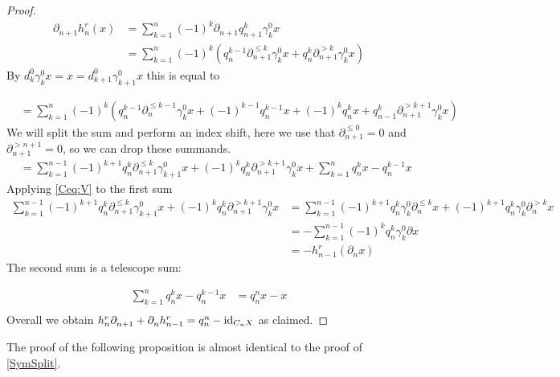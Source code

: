 \documentclass[12pt]{amsart}
\theoremstyle{plain}
\numberwithin{lemma}{\DefaultNumberTheoremWithin}
\numberwithin{claim}{\DefaultNumberTheoremWithin}
\numberwithin{theorem}{\DefaultNumberTheoremWithin}
\numberwithin{corollary}{\DefaultNumberTheoremWithin}
\numberwithin{proposition}{\DefaultNumberTheoremWithin}
\numberwithin{conjecture}{\DefaultNumberTheoremWithin}
\theoremstyle{definition}
\theoremstyle{definition}
\numberwithin{question}{\DefaultNumberTheoremWithin}
\theoremstyle{definition}
\numberwithin{problem}{\DefaultNumberTheoremWithin}
\theoremstyle{remark}
\numberwithin{remark}{\DefaultNumberTheoremWithin}
\theoremstyle{remark}
\numberwithin{example}{\DefaultNumberTheoremWithin}
\def\id{\textnormal{id}}
\def\Connection{\gamma}
\newcommand{\del}{\partial}
\newcommand{\argdelkub}[2]{\del^{#1}_{#2}}
\newcommand{\prev}[2]{q_{#2}^{#1}}
\newcommand{\hrev}[1]{h^r_{#1}}
\begin{document}
\begin{proof}
    \begin{align*}
        \argdelkub{}{n+1} \hrev{n}(x) &= \sum_{k=1}^n(-1)^k \argdelkub{}{n+1} \prev{k}{n+1}\Connection_k^0 x \\
        &=\sum_{k=1}^n(-1)^k(\prev{k-1}{n}\argdelkub{\leq k}{n+1}\Connection_k^0x + \prev{k}{n}\argdelkub{>k}{n+1}\Connection_k^0x)
        \end{align*}
    By $d_k^0\Connection_k^0x=x=d_{k+1}^0\Connection_{k+1}^0x$ this is equal to 
        
    \begin{align*}
        &=\sum_{k=1}^n(-1)^k(\prev{k-1}{n}\argdelkub{\leq k-1}{n}\Connection_k^0x+(-1)^{k-1}\prev{k-1}{n}x +(-1)^{k}\prev{k}{n}
        x + \prev{k}{n-1}\argdelkub{>k+1}{n+1}\Connection_k^0x)
    \end{align*}
We will split the sum and perform an index shift, here we use that $\argdelkub{\leq 0}{n+1}=0$ and $\argdelkub{>n+1}{n+1}=0$, so we can drop these summands.
\begin{align*}
        &=\sum_{k=1}^{n-1}(-1)^{k+1}\prev{k}{n}\argdelkub{\leq k}{n+1}\Connection_{k+1}^0x+(-1)^{k}\prev{k}{n}\argdelkub{>k+1}{n+1}\Connection_k^0x +\sum_{k=1}^n \prev{k}{n}x-\prev{k-1}{n}x 
\end{align*}
Applying \eqref{Ceq:V} to the first sum
\begin{align*}
    \sum_{k=1}^{n-1}(-1)^{k+1}\prev{k}{n}\argdelkub{\leq k}{n+1}\Connection_{k+1}^0x+(-1)^{k}\prev{k}{n}\argdelkub{>k+1}{n+1}\Connection_k^0x
    &=\sum_{k=1}^{n-1}(-1)^{k+1}\prev{k}{n}\Connection_{k}^0\argdelkub{\leq k}{n}x+(-1)^{k+1}\prev{k}{n}\Connection_k^0\argdelkub{>k}{n}x\\
    &=-\sum_{k=1}^{n-1}(-1)^{k}\prev{k}{n}\Connection_{k}^0\del x\\
    &=-\hrev{n-1}(\argdelkub{}{n} x)
\end{align*}
The second sum is a telescope sum:

\begin{align*}
\sum_{k=1}^n \prev{k}{n}x-\prev{k-1}{n}x&=\prev{n}{n}x-x\\
\end{align*}
Overall we obtain $\hrev{n}\argdelkub{}{n+1} +\argdelkub{}{n} \hrev{n-1}=\prev{n}{n}-\id_{C_nX}$ as claimed.
\end{proof}

The proof of the following proposition is almost identical to the proof of \ref{SymSplit}.
\end{document}
